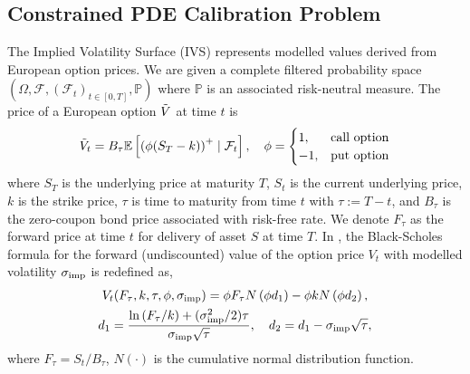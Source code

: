 \documentclass[sigconf, authorversion=true, nonacm=true]{acmart}
\begin{document}
\subsection{Constrained PDE Calibration Problem}
The Implied Volatility Surface (IVS) represents modelled values derived from European option prices. We are given a complete filtered probability space {\small$\left(\Omega, \mathcal{F},\left(\mathcal{F}_t\right)_{t \in [0,T]}, \mathbb{P}\right)$} where {\small$\mathbb{P}$} is an associated risk-neutral measure. The price of a European option $\Tilde{V}$ at time $t$ is
\begin{equation}
    \Tilde{V}_t = B_\tau\mathbb{E}\left[\left(\phi(S_T - k)\right)^+ \mid \mathcal{F}_t\right],\quad \phi = \begin{cases}1, & \text{call option}\\-1, & \text{put option}\end{cases}
\end{equation}
where $S_T$ is the underlying price at maturity $T$, $S_t$ is the current underlying price, $k$ is the strike price, $\tau$ is time to maturity from time $t$ with $\tau:=T-t$, and $B_\tau$ is the zero-coupon bond price associated with risk-free rate. We denote $F_\tau$ as the forward price at time $t$ for delivery of asset $S$ at time $T$. In \cite{black1973pricing, black1976pricing, gatheral2011volatility}, the Black-Scholes formula for the forward (undiscounted) value of the option price $V_t$ with modelled volatility $\sigma_{\rm{imp}}$ is redefined as,
\begin{equation}
\begin{gathered}
    V_t (F_\tau, k, \tau, \phi, \sigma_{\rm{imp}}) = \phi F_\tau N\left(\phi d_1\right) - \phi k N\left(\phi d_2\right),\\
    d_1 = \frac{\ln\left(F_\tau / k\right) + (\sigma_{\rm{imp}}^2 / 2) \tau}{\sigma_{\rm{imp}}\sqrt{\tau}}, \quad d_2 = d_1 - \sigma_{\rm{imp}}\sqrt{\tau},
    \label{eq: BS_formula}
\end{gathered}
\end{equation}
where $F_\tau = S_t / B_\tau$, $N(\cdot)$ is the cumulative normal distribution function.
\end{document}
